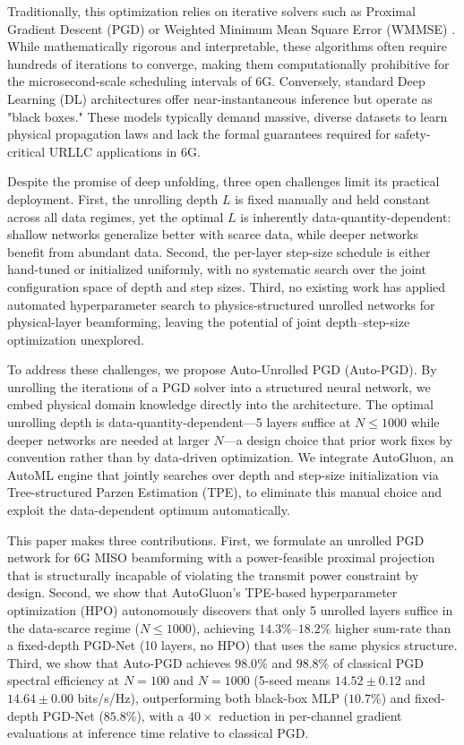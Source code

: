\documentclass[conference,11pt]{IEEEtran}
\begin{document}
Traditionally, this optimization relies on iterative solvers such as Proximal Gradient Descent (PGD) or Weighted Minimum Mean Square Error (WMMSE) \cite{shi2011wmmse}. While mathematically rigorous and interpretable, these algorithms often require hundreds of iterations to converge, making them computationally prohibitive for the microsecond-scale scheduling intervals of 6G. Conversely, standard Deep Learning (DL) architectures offer near-instantaneous inference but operate as "black boxes." These models typically demand massive, diverse datasets to learn physical propagation laws and lack the formal guarantees required for safety-critical URLLC applications in 6G.

Despite the promise of deep unfolding, three open challenges limit its practical deployment. First, the unrolling depth $L$ is fixed manually and held constant across all data regimes, yet the optimal $L$ is inherently data-quantity-dependent: shallow networks generalize better with scarce data, while deeper networks benefit from abundant data. Second, the per-layer step-size schedule is either hand-tuned or initialized uniformly, with no systematic search over the joint configuration space of depth and step sizes. Third, no existing work has applied automated hyperparameter search to physics-structured unrolled networks for physical-layer beamforming, leaving the potential of joint depth--step-size optimization unexplored.

To address these challenges, we propose Auto-Unrolled PGD (Auto-PGD). By unrolling the iterations of a PGD solver into a structured neural network, we embed physical domain knowledge directly into the architecture. The optimal unrolling depth is data-quantity-dependent---5 layers suffice at $N{\leq}1000$ while deeper networks are needed at larger $N$---a design choice that prior work fixes by convention rather than by data-driven optimization. We integrate AutoGluon, an AutoML engine that jointly searches over depth and step-size initialization via Tree-structured Parzen Estimation (TPE), to eliminate this manual choice and exploit the data-dependent optimum automatically.

This paper makes three contributions. First, we formulate an unrolled PGD network for 6G MISO beamforming with a power-feasible proximal projection that is structurally incapable of violating the transmit power constraint by design. Second, we show that AutoGluon's TPE-based hyperparameter optimization (HPO) autonomously discovers that only 5 unrolled layers suffice in the data-scarce regime ($N{\leq}1000$), achieving $14.3\%$--$18.2\%$ higher sum-rate than a fixed-depth PGD-Net (10 layers, no HPO) that uses the same physics structure. Third, we show that Auto-PGD achieves $98.0\%$ and $98.8\%$ of classical PGD spectral efficiency at $N{=}100$ and $N{=}1000$ (5-seed means $14.52{\pm}0.12$ and $14.64{\pm}0.00$ bits/s/Hz), outperforming both black-box MLP ($10.7\%$) and fixed-depth PGD-Net ($85.8\%$), with a $40{\times}$ reduction in per-channel gradient evaluations at inference time relative to classical PGD.
\end{document}
